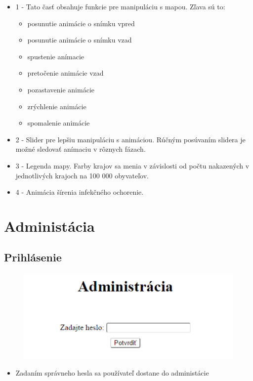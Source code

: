 \documentclass[12pt,a4paper]{report}
\begin{document}
\begin{itemize}
	\item 1 - Tato časť obsahuje funkcie pre manipuláciu s mapou. Zľava sú to:
		\begin{itemize}
			\item posunutie animácie o snímku vpred
			\item posunutie animácie o snímku vzad
			\item spustenie anímacie
			\item pretočenie animácie vzad
			\item pozastavenie animácie
			\item zrýchlenie animácie
			\item spomalenie animácie
		\end{itemize} 
	\item 2 - Slider pre lepšiu manipuláciu s animáciou. Rúčným posúvaním slidera je možné sledovať anímaciu v rôznych fázach.
	\item 3 - Legenda mapy. Farby krajov sa menia v závislosti od počtu nakazených v jednotlivých krajoch na 100 000 obyvateľov.
	\item 4 - Animácia šírenia infekčného ochorenie.
\end{itemize}

\renewcommand{\chaptername}{}	
\chapter[Administácia]{\rmfamily\bfseries
	Administácia}

\section{Prihlásenie}
\begin{figure}[htb]
	\includegraphics[scale=0.8]{prihlasenie}
	\label{fig:prihlasenie}
\end{figure}

\begin{itemize}

	\item Zadaním správneho hesla sa používateľ dostane do administácie
\end{itemize}
\end{document}
